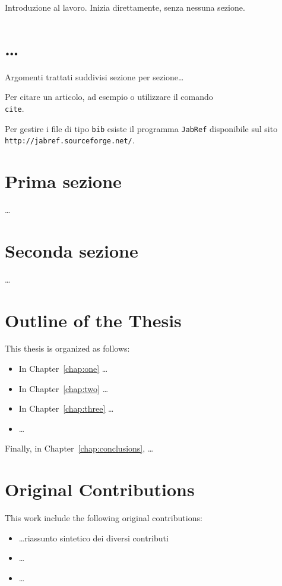Introduzione al lavoro. Inizia direttamente, senza nessuna sezione.

\section{\dots}
Argomenti trattati suddivisi sezione per sezione\dots

Per citare un articolo, ad esempio \cite{Ackley1987} o \cite{Ackley1987,Altenberg1994} utilizzare il comando \texttt{\\cite}. 

Per gestire i file di tipo \texttt{bib} esiste il programma \texttt{JabRef} disponibile sul sito \texttt{http://jabref.sourceforge.net/}.

\section*{Prima sezione}
\dots

\section*{Seconda sezione}
\dots

\section*{Outline of the Thesis}
This thesis is organized as follows: 
\begin{itemize}
\item In Chapter~\ref{chap:one} \dots
\item In Chapter~\ref{chap:two} \dots
\item In Chapter~\ref{chap:three} \dots
\item \dots
\end{itemize}
Finally, in Chapter~\ref{chap:conclusions}, \dots

\section*{Original Contributions}
This work include the following original contributions:
\begin{itemize}
\item \dots riassunto sintetico dei diversi contributi
\item \dots
\item \dots
\end{itemize}

